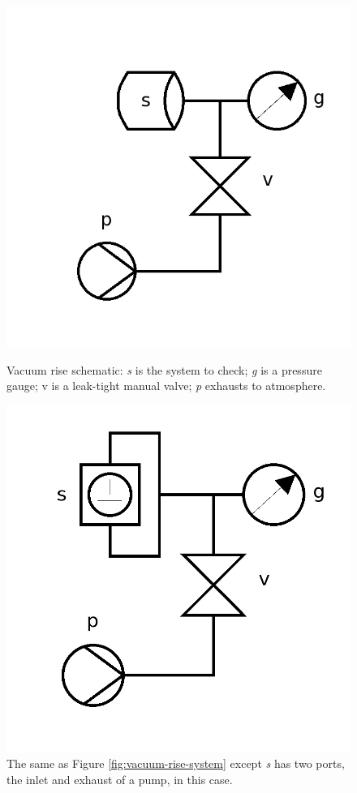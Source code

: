 \begin{figure}[!htbp]
 \centering
 \begin{minipage}{.48\textwidth}
 \includegraphics[width=\textwidth]{./img/vacuum-rise-system.png}
 \caption{Vacuum rise schematic: \textit{s} is the system to check; \textit{g} is a pressure gauge; \textit{}v is a leak-tight manual valve; \textit{p} exhausts to atmosphere.}
 \label{fig:vacuum-rise-system}
 \end{minipage}
 \quad
 \begin{minipage}{.48\textwidth}
 \includegraphics[width=\textwidth]{./img/vacuum-rise-dual-system.png}
 \caption{The same as Figure \ref{fig:vacuum-rise-system} except \textit{s} has two ports, the inlet and exhaust of a pump, in this case.}
 \label{fig:vacuum-rise-dual-system}
 \end{minipage}
\end{figure}


